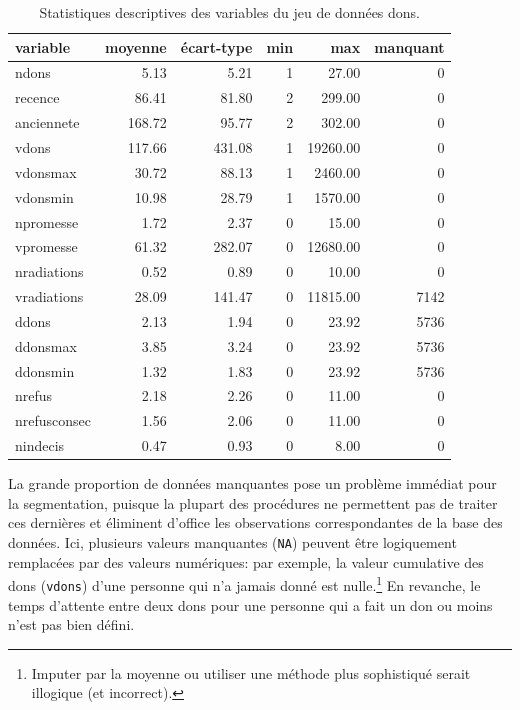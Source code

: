 \documentclass[
  11pt,
  letterpaper,
]{scrbook}
\theoremstyle{definition}
\theoremstyle{remark}
\begin{document}
\hypertarget{tbl-statdescriptdons}{}
\begin{table}
\caption{\label{tbl-statdescriptdons}Statistiques descriptives des variables du jeu de données dons. }\tabularnewline

\centering
\begin{tabular}{lrrrrr}
\toprule
variable & moyenne & écart-type & min & max & manquant\\
\midrule
ndons & 5.13 & 5.21 & 1 & 27.00 & 0\\
recence & 86.41 & 81.80 & 2 & 299.00 & 0\\
anciennete & 168.72 & 95.77 & 2 & 302.00 & 0\\
vdons & 117.66 & 431.08 & 1 & 19260.00 & 0\\
vdonsmax & 30.72 & 88.13 & 1 & 2460.00 & 0\\
\addlinespace
vdonsmin & 10.98 & 28.79 & 1 & 1570.00 & 0\\
npromesse & 1.72 & 2.37 & 0 & 15.00 & 0\\
vpromesse & 61.32 & 282.07 & 0 & 12680.00 & 0\\
nradiations & 0.52 & 0.89 & 0 & 10.00 & 0\\
vradiations & 28.09 & 141.47 & 0 & 11815.00 & 7142\\
\addlinespace
ddons & 2.13 & 1.94 & 0 & 23.92 & 5736\\
ddonsmax & 3.85 & 3.24 & 0 & 23.92 & 5736\\
ddonsmin & 1.32 & 1.83 & 0 & 23.92 & 5736\\
nrefus & 2.18 & 2.26 & 0 & 11.00 & 0\\
nrefusconsec & 1.56 & 2.06 & 0 & 11.00 & 0\\
\addlinespace
nindecis & 0.47 & 0.93 & 0 & 8.00 & 0\\
\bottomrule
\end{tabular}
\end{table}

La grande proportion de données manquantes pose un problème immédiat
pour la segmentation, puisque la plupart des procédures ne permettent
pas de traiter ces dernières et éliminent d'office les observations
correspondantes de la base des données. Ici, plusieurs valeurs
manquantes (\texttt{NA}) peuvent être logiquement remplacées par des
valeurs numériques: par exemple, la valeur cumulative des dons
(\texttt{vdons}) d'une personne qui n'a jamais donné est
nulle.\footnote{Imputer par la moyenne ou utiliser une méthode plus
  sophistiqué serait illogique (et incorrect).} En revanche, le temps
d'attente entre deux dons pour une personne qui a fait un don ou moins
n'est pas bien défini.
\end{document}
